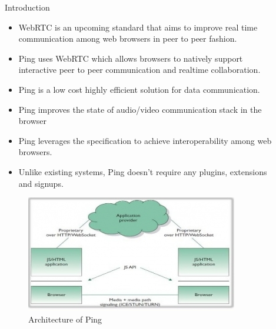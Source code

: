 \documentclass[final]{beamer}
\newlength{\sepwid}
\newlength{\onecolwid}
\newlength{\twocolwid}
\begin{document}
\begin{frame}[t]
\begin{columns}[t]
\begin{column}{\onecolwid}
\begin{block}{Introduction}
\begin{itemize}
\item WebRTC is an upcoming standard that aims to improve real time communication among web browsers in peer to peer fashion.
\item Ping uses WebRTC which allows browsers to natively support interactive peer to peer communication and realtime collaboration.
\item Ping is a low cost highly efficient solution for data communication.
\item Ping improves the state of audio/video communication stack in the browser
\item Ping leverages the specification to achieve interoperability among web browsers.
\item Unlike existing systems, Ping doesn't require any plugins, extensions and signups. 
\end{itemize}



\end{block}


\begin{figure}
\includegraphics[width=0.8\linewidth]{step0002.jpg}
\caption{Architecture of Ping}
\end{figure}


\end{column} %

\begin{column}{\sepwid}\end{column} %

\begin{column}{\twocolwid} %


\end{column}
\end{columns}
\end{frame}
\end{document}
